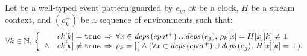 \begin{skippableproof}
    Let  be a well-typed \GRSync event pattern guarded by $e_g$, $ck$ be a
    clock, $H$ be a stream context, and $(\rho_k^+)$ be a sequence of environments such that:
    \begin{equation*}
        \forall k \in \mathbb{N}, \,
        \left\{
        \begin{array}{ll}
                   & ck[k] = \mathtt{{true}} \, \Rightarrow \,  \forall x \in {\ensuremath{\textit{deps}\left(epat^+\right)}} \cup {\ensuremath{\textit{deps}\left(e_g\right)}}, \,
            \rho_k[x] = H[x][k] \neq \bot                                                             \\
            \wedge & ck[k] \neq \mathtt{{true}} \, \Rightarrow \,  \rho_k = [\,] \wedge (\forall
            x \in {\ensuremath{\textit{deps}\left(epat^+\right)}} \cup {\ensuremath{\textit{deps}\left(e_g\right)}}, \, H[x][k] = \bot).                                  \\
        \end{array}
        \right.
    \end{equation*}


\end{skippableproof}
